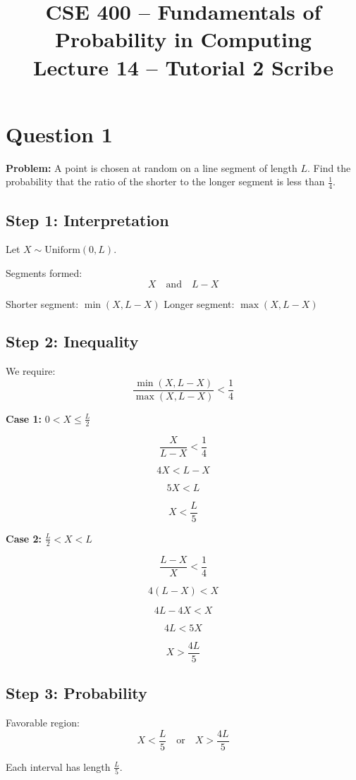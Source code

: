 \documentclass[12pt]{article}
\title{CSE 400 -- Fundamentals of Probability in Computing\\
Lecture 14 -- Tutorial 2 Scribe}
\author{}
\date{}
\begin{document}
\maketitle

\section*{Question 1}

\textbf{Problem:}  
A point is chosen at random on a line segment of length $L$.  
Find the probability that the ratio of the shorter to the longer segment is less than $\frac14$.

\subsection*{Step 1: Interpretation}

Let $X \sim \text{Uniform}(0,L)$.

Segments formed:
\[
X \quad \text{and} \quad L - X
\]

Shorter segment: $\min(X, L-X)$  
Longer segment: $\max(X, L-X)$

\subsection*{Step 2: Inequality}

We require:
\[
\frac{\min(X,L-X)}{\max(X,L-X)} < \frac14
\]

\textbf{Case 1:} $0 < X \le \frac{L}{2}$

\[
\frac{X}{L-X} < \frac14
\]

\[
4X < L - X
\]

\[
5X < L
\]

\[
X < \frac{L}{5}
\]

\textbf{Case 2:} $\frac{L}{2} < X < L$

\[
\frac{L-X}{X} < \frac14
\]

\[
4(L-X) < X
\]

\[
4L - 4X < X
\]

\[
4L < 5X
\]

\[
X > \frac{4L}{5}
\]

\subsection*{Step 3: Probability}

Favorable region:
\[
X < \frac{L}{5}
\quad \text{or} \quad
X > \frac{4L}{5}
\]

Each interval has length $\frac{L}{5}$.
\end{document}
